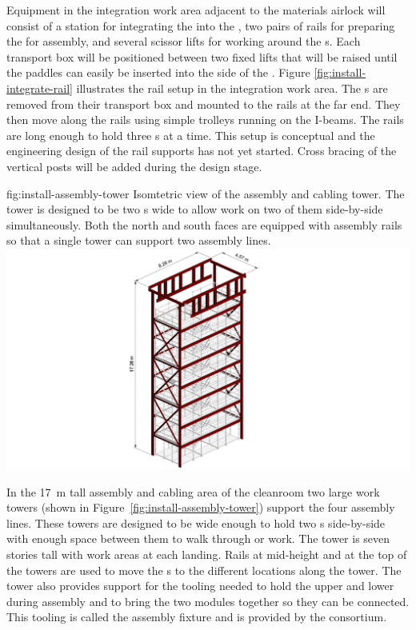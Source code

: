 Equipment in the integration work area adjacent to the materials airlock will consist of a station for integrating the  into the , two pairs of rails for preparing the  for assembly, and several scissor lifts for working around the s. 
Each  transport box will be positioned between two fixed lifts that will be raised until the  paddles can easily be inserted into the side of the . 
Figure \ref{fig:install-integrate-rail} illustrates the rail setup in the integration work area. 
The s are removed from their transport box and mounted to the rails at the far end. 
They then move along the rails using simple trolleys running on the I-beams. 
The rails are long enough to hold three s at a time. 
This setup is conceptual and the engineering design of the rail supports has not yet started. 
Cross bracing of the vertical posts will be added during the design stage. 

\begin{dunefigure}{fig:install-assembly-tower}
  {
  Isomtetric view of the  assembly and cabling tower. 
  The tower is designed to be two s wide to allow work on two of them side-by-side simultaneously. 
  Both the north and south faces are equipped with assembly rails so that 
   a single tower can support two assembly lines.
  }
\includegraphics[width=.5\textwidth]{graphics/install-assembly-tower.pdf}
\end{dunefigure}


In the \SI{17}{m} tall   assembly and cabling area of the cleanroom two large work towers (shown in Figure~\ref{fig:install-assembly-tower}) support the four assembly lines. 
These towers are designed to be wide enough to hold two s  side-by-side with enough space between them to walk through or work. 
The tower is seven stories tall with work areas at each landing.
Rails at mid-height and at the top of the towers are used to move the s to the different locations along the tower. 
The %
tower also provides support for the tooling needed to hold the upper and lower  during assembly and to bring the two modules together so they can be connected. This tooling is called the  assembly fixture and is provided by the  consortium. 

